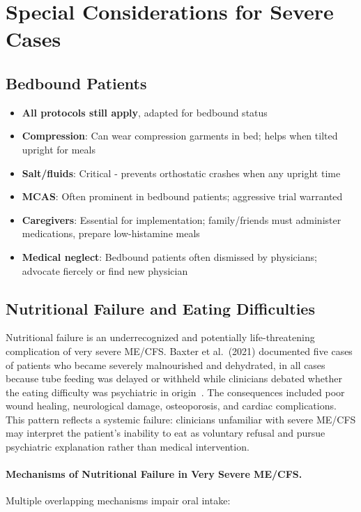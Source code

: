\section{Special Considerations for Severe Cases}
\label{sec:special-considerations}

\subsection{Bedbound Patients}

\begin{itemize}
    \item \textbf{All protocols still apply}, adapted for bedbound status
    \item \textbf{Compression}: Can wear compression garments in bed; helps when tilted upright for meals
    \item \textbf{Salt/fluids}: Critical - prevents orthostatic crashes when any upright time
    \item \textbf{MCAS}: Often prominent in bedbound patients; aggressive trial warranted
    \item \textbf{Caregivers}: Essential for implementation; family/friends must administer medications, prepare low-histamine meals
    \item \textbf{Medical neglect}: Bedbound patients often dismissed by physicians; advocate fiercely or find new physician
\end{itemize}

\subsection{Nutritional Failure and Eating Difficulties}
\label{sec:nutritional-failure}

Nutritional failure is an underrecognized and potentially life-threatening complication of very severe ME/CFS. Baxter et al.\ (2021) documented five cases of patients who became severely malnourished and dehydrated, in all cases because tube feeding was delayed or withheld while clinicians debated whether the eating difficulty was psychiatric in origin~\cite{Baxter2021malnutrition}. The consequences included poor wound healing, neurological damage, osteoporosis, and cardiac complications. This pattern reflects a systemic failure: clinicians unfamiliar with severe ME/CFS may interpret the patient's inability to eat as voluntary refusal and pursue psychiatric explanation rather than medical intervention.

\paragraph{Mechanisms of Nutritional Failure in Very Severe ME/CFS.}
Multiple overlapping mechanisms impair oral intake:

